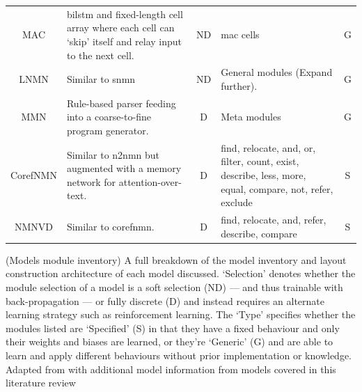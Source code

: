 \begin{table}[]
\begin{tabularx}{\linewidth}{cXcXc}
        MAC                                & \gls{bilstm} and fixed-length cell array where each cell can `skip' itself and relay input to the next cell.      & ND        & \gls{mac} cells                                                                                                           & G    \\
        LNMN                               & Similar to \gls{snmn}                                                                                             & ND        & General modules (Expand further).                                                                                         & G    \\
        MMN\cite{chen_meta_2020}           & Rule-based parser feeding into a coarse-to-fine program generator.                                                & D         & Meta modules                                                                                                              & G    \\
        CorefNMN\cite{kottur_visual_2018}  & Similar to \gls{n2nmn} but augmented with a memory network for attention-over-text.                               & D         & find, relocate, and, or, filter, count, exist, describe, less, more, equal, compare, not, refer, exclude                  & S    \\
        NMNVD\cite{cho_visual_2021}        & Similar to \gls{corefnmn}.                                                                                        & D         & find, relocate, and, refer, describe, compare                                                                             & S    \\ \bottomrule
    \end{tabularx}
    \captionsource(Models module inventory)
    {A full breakdown of the model inventory and layout construction architecture of each model discussed. `Selection' denotes whether the module selection of a model is a soft selection (ND) --- and thus trainable with back-propagation --- or fully discrete (D) and instead requires an alternate learning strategy such as reinforcement learning. The `Type' specifies whether the modules listed are `Specified' (S) in that they have a fixed behaviour and only their weights and biases are learned, or they're `Generic' (G) and are able to learn and apply different behaviours without prior implementation or knowledge.\label{tab:models_module_inventory}}
    {Adapted from \citeauthor{fishandi_neural_2023}\cite{fishandi_neural_2023} with additional model information from models covered in this literature review}
\end{table}
